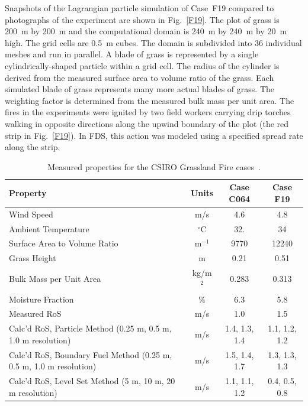 \documentclass[journal,article,atmosphere,submit,moreauthors,pdftex]{Definitions/mdpi}
\begin{document}
Snapshots of the Lagrangian particle simulation of Case~F19 compared to photographs of the experiment are shown in Fig.~\ref{F19}. The plot of grass is 200~m by 200~m and the computational domain is 240~m by 240~m by 20~m high. The grid cells are 0.5~m cubes. The domain is subdivided into 36 individual meshes and run in parallel. A blade of grass is represented by a single cylindrically-shaped particle within a grid cell. The radius of the cylinder is derived from the measured surface area to volume ratio of the grass. Each simulated blade of grass represents many more actual blades of grass. The weighting factor is determined from the measured bulk mass per unit area. The fires in the experiments were ignited by two field workers carrying drip torches walking in opposite directions along the upwind boundary of the plot (the red strip in Fig.~\ref{F19}). In FDS, this action was modeled using a specified spread rate along the strip.

\begin{table}[ht]
\begin{center}
\caption[Measured properties for the CSIRO Grassland Fire cases]{Measured properties for the CSIRO Grassland Fire cases~\cite{Cheney:IJWF1993}.}
\label{Properties_Grasses}
\begin{tabular}{|l|c|c|c|}
\hline
Property                        & Units        & Case C064 & Case F19    \\ \hline \hline
Wind Speed                      & m/s          & 4.6       & 4.8         \\ \hline
Ambient Temperature             & $^\circ$C    & 32.       & 34          \\ \hline
Surface Area to Volume Ratio    & m$^{-1}$     & 9770      & 12240       \\ \hline
Grass Height                    & m            & 0.21      & 0.51        \\ \hline
Bulk Mass per Unit Area         & kg/m$^2$     & 0.283     & 0.313       \\ \hline
Moisture Fraction               & \%           & 6.3       & 5.8         \\ \hline
Measured RoS                    & m/s          & 1.0       & 1.5         \\ \hline
Calc'd RoS, Particle Method (0.25 m, 0.5 m, 1.0 m resolution) & m/s           & 1.4, 1.3, 1.4           & 1.1, 1.2, 1.2          \\ \hline
Calc'd RoS, Boundary Fuel Method (0.25 m, 0.5 m, 1.0 m resolution) & m/s      & 1.5, 1.4, 1.7           & 1.3, 1.3, 1.3           \\ \hline
Calc'd RoS, Level Set Method (5 m, 10 m, 20 m resolution) & m/s          & 1.1, 1.1, 1.2          & 0.4, 0.5, 0.8          \\ \hline
\end{tabular}
\end{center}
\end{table}
\end{document}
